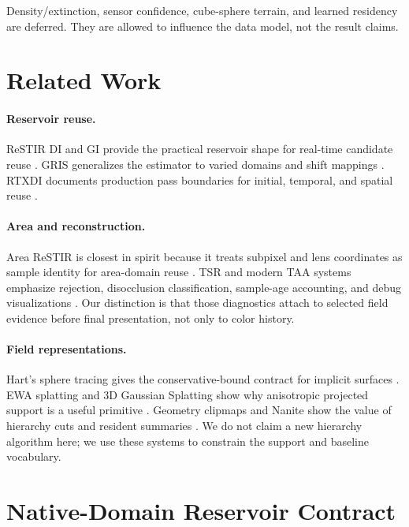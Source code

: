 \documentclass[11pt]{article}
\newcommand{\ReSTIR}{ReSTIR}
\newcommand{\AreaReSTIR}{Area ReSTIR}
\newcommand{\TSR}{TSR}
\newcommand{\GRIS}{GRIS}
\begin{document}
Density/extinction, sensor confidence, cube-sphere terrain, and learned
residency are deferred.  They are allowed to influence the data model, not the
result claims.

\section{Related Work}

\paragraph{Reservoir reuse.}
\ReSTIR{} DI and GI provide the practical reservoir shape for real-time
candidate reuse \cite{bitterli2020restir,ouyang2021restirgi}.  \GRIS{}
generalizes the estimator to varied domains and shift mappings
\cite{lin2022gris}.  RTXDI documents production pass boundaries for initial,
temporal, and spatial reuse \cite{rtxdiRestirGI,rtxdiRestirPT}.

\paragraph{Area and reconstruction.}
\AreaReSTIR{} is closest in spirit because it treats subpixel and lens
coordinates as sample identity for area-domain reuse \cite{zhang2024arearestir,
areaRestirCode}.  \TSR{} and modern TAA systems emphasize rejection,
disocclusion classification, sample-age accounting, and debug visualizations
\cite{unrealTSR,unrealTSRFAQ}.  Our distinction is that those diagnostics attach
to selected field evidence before final presentation, not only to color
history.

\paragraph{Field representations.}
Hart's sphere tracing gives the conservative-bound contract for implicit
surfaces \cite{hart1996sphere}.  EWA splatting and 3D Gaussian Splatting show
why anisotropic projected support is a useful primitive
\cite{zwicker2001ewa,ren2002objectewa,kerbl2023gaussian}.  Geometry clipmaps
and Nanite show the value of hierarchy cuts and resident summaries
\cite{asirvatham2005gpuclipmaps,karis2021nanite}.  We do not claim a new
hierarchy algorithm here; we use these systems to constrain the support and
baseline vocabulary.

\section{Native-Domain Reservoir Contract}
\end{document}
